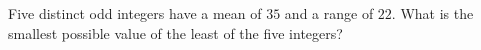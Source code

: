 Five distinct odd integers have a mean of $35$ and a range of $22$. What is the smallest possible value of the least of the five integers?

